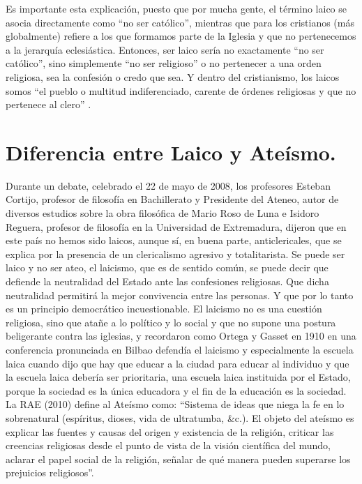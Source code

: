 \documentclass[12pt]{book} %
\begin{document}
Es importante esta explicación, puesto que por mucha gente, el término laico se asocia directamente como “no ser católico”, mientras que para los cristianos (más globalmente) refiere a los que formamos parte de la Iglesia y que no pertenecemos a la jerarquía eclesiástica. Entonces, ser laico sería no exactamente “no ser católico”, sino simplemente “no ser religioso” o no pertenecer a una orden religiosa, sea la confesión o credo que sea. Y dentro del cristianismo, los laicos somos “el pueblo o multitud indiferenciado, carente de órdenes religiosas y que no pertenece al clero” .

\section{Diferencia entre Laico y Ateísmo.}
Durante un debate, celebrado el 22 de mayo de 2008, los profesores Esteban Cortijo, profesor de filosofía en Bachillerato y Presidente del Ateneo, autor de diversos estudios sobre la obra filosófica de Mario Roso de Luna e Isidoro Reguera, profesor de filosofía en la Universidad de Extremadura, dijeron que en este país no hemos sido laicos, aunque sí, en buena parte, anticlericales, que se explica por la presencia de un clericalismo agresivo y totalitarista. Se puede ser laico y no ser ateo, el laicismo, que es de sentido común, se puede decir que defiende la neutralidad del Estado ante las confesiones religiosas. Que dicha neutralidad permitirá la mejor convivencia entre las personas. Y que por lo tanto es un principio democrático incuestionable. El laicismo no es una cuestión religiosa, sino que atañe a lo político y lo social y que no supone una postura beligerante contra las iglesias, y recordaron como Ortega y Gasset en 1910 en una conferencia pronunciada en Bilbao defendía el laicismo y especialmente la escuela laica cuando dijo que hay que educar a la ciudad para educar al individuo y que la escuela laica debería ser prioritaria, una escuela laica instituida por el Estado, porque la sociedad es la única educadora y el fin de la educación es la sociedad.\\

La RAE (2010) define al Ateísmo como: “Sistema de ideas que niega la fe en lo sobrenatural (espíritus, dioses, vida de ultratumba, \&c.). El objeto del ateísmo es explicar las fuentes y causas del origen y existencia de la religión, criticar las creencias religiosas desde el punto de vista de la visión científica del mundo, aclarar el papel social de la religión, señalar de qué manera pueden superarse los prejuicios religiosos”.\\
\end{document}
